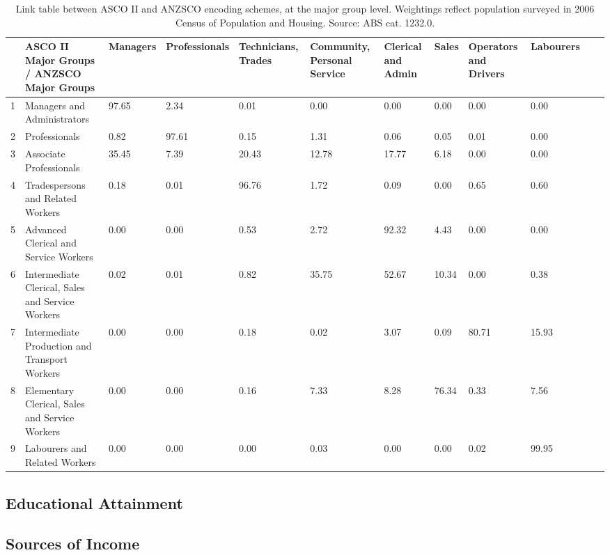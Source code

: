 \begin{sidewaystable}[ht]
\centering
{\scriptsize
\begin{tabular}{|r|p{3cm}|p{1.5cm}|p{1.5cm}|p{1.5cm}|p{1.5cm}|p{1.5cm}|p{1.5cm}|p{1.5cm}|p{1.5cm}|p{1.5cm}|p{1.5cm}|}
  \hline
 & ASCO II Major Groups / ANZSCO Major Groups & Managers & Professionals & Technicians, Trades & Community, Personal Service & Clerical and Admin & Sales & Operators and Drivers & Labourers \\
  \hline
1 & Managers and Administrators & 97.65 & 2.34 & 0.01 & 0.00 & 0.00 & 0.00 & 0.00 & 0.00 \\
  2 & Professionals & 0.82 & 97.61 & 0.15 & 1.31 & 0.06 & 0.05 & 0.01 & 0.00 \\
  3 & Associate Professionals & 35.45 & 7.39 & 20.43 & 12.78 & 17.77 & 6.18 & 0.00 & 0.00 \\
  4 & Tradespersons and Related Workers & 0.18 & 0.01 & 96.76 & 1.72 & 0.09 & 0.00 & 0.65 & 0.60 \\
  5 & Advanced Clerical and Service Workers & 0.00 & 0.00 & 0.53 & 2.72 & 92.32 & 4.43 & 0.00 & 0.00 \\
  6 & Intermediate Clerical, Sales and Service Workers & 0.02 & 0.01 & 0.82 & 35.75 & 52.67 & 10.34 & 0.00 & 0.38 \\
  7 & Intermediate Production and Transport Workers & 0.00 & 0.00 & 0.18 & 0.02 & 3.07 & 0.09 & 80.71 & 15.93 \\
  8 & Elementary Clerical, Sales and Service Workers & 0.00 & 0.00 & 0.16 & 7.33 & 8.28 & 76.34 & 0.33 & 7.56 \\
  9 & Labourers and Related Workers & 0.00 & 0.00 & 0.00 & 0.03 & 0.00 & 0.00 & 0.02 & 99.95 \\
   \hline
\end{tabular}
}
\caption{Link table between ASCO II and ANZSCO encoding schemes, at the major group level. Weightings reflect population surveyed in 2006 Census of Population and Housing. Source: ABS cat. 1232.0.}
\label{tbl:link}
\end{sidewaystable}


\subsection{Educational Attainment}


\subsection{Sources of Income}

